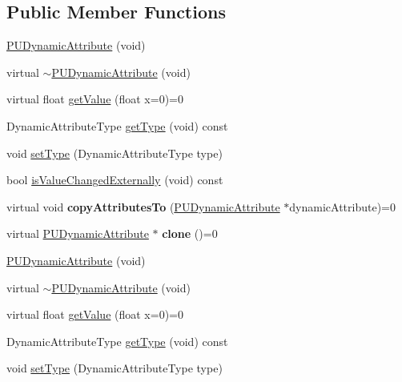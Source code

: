 \subsection*{Public Member Functions}
\begin{DoxyCompactItemize}
\item 
\hyperlink{classPUDynamicAttribute_aec733973af85ac7b0f3076ba6d51491a}{P\+U\+Dynamic\+Attribute} (void)
\item 
virtual \hyperlink{classPUDynamicAttribute_abecf5ef42c0816ae7a228fd7388c516e}{$\sim$\+P\+U\+Dynamic\+Attribute} (void)
\item 
virtual float \hyperlink{classPUDynamicAttribute_ac478ecb2528f32b536b1faa72558c756}{get\+Value} (float x=0)=0
\item 
Dynamic\+Attribute\+Type \hyperlink{classPUDynamicAttribute_aafc34cab932ab7e63c1e8edb682a9d3d}{get\+Type} (void) const
\item 
void \hyperlink{classPUDynamicAttribute_ae8f339de34c30da332fb56648f862594}{set\+Type} (Dynamic\+Attribute\+Type type)
\item 
bool \hyperlink{classPUDynamicAttribute_adcf769af69d3508302426d751646425f}{is\+Value\+Changed\+Externally} (void) const
\item 
\mbox{\label{classPUDynamicAttribute_a57729a2c17d0c3444e4160e6eedc1605}} 
virtual void {\bfseries copy\+Attributes\+To} (\hyperlink{classPUDynamicAttribute}{P\+U\+Dynamic\+Attribute} $\ast$dynamic\+Attribute)=0
\item 
\mbox{\label{classPUDynamicAttribute_ab387d4adcb71e7f9a216031cb2857744}} 
virtual \hyperlink{classPUDynamicAttribute}{P\+U\+Dynamic\+Attribute} $\ast$ {\bfseries clone} ()=0
\item 
\hyperlink{classPUDynamicAttribute_a43e1f4e50f5f5e0282f5b8df14c19e26}{P\+U\+Dynamic\+Attribute} (void)
\item 
virtual \hyperlink{classPUDynamicAttribute_ab40c13ac5670982e7c416b1adcbac952}{$\sim$\+P\+U\+Dynamic\+Attribute} (void)
\item 
virtual float \hyperlink{classPUDynamicAttribute_ac478ecb2528f32b536b1faa72558c756}{get\+Value} (float x=0)=0
\item 
Dynamic\+Attribute\+Type \hyperlink{classPUDynamicAttribute_a9bc561d0ff39a6c543ab628c764e709d}{get\+Type} (void) const
\item 
void \hyperlink{classPUDynamicAttribute_ae8f339de34c30da332fb56648f862594}{set\+Type} (Dynamic\+Attribute\+Type type)

\end{DoxyCompactItemize}
